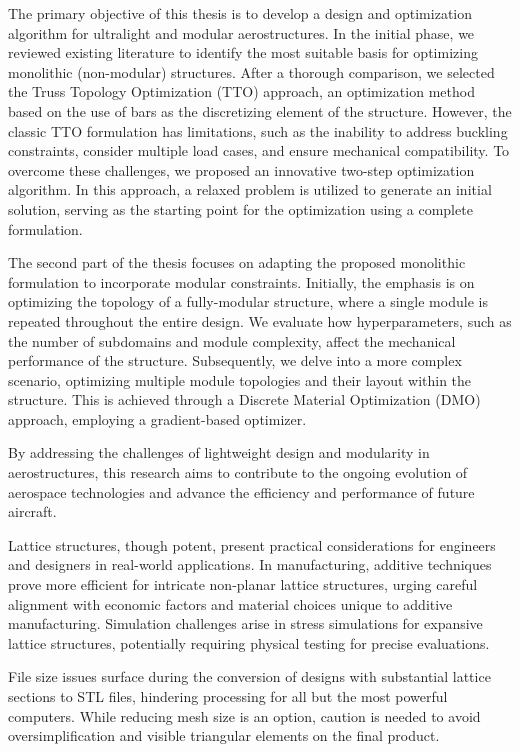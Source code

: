 The primary objective of this thesis is to develop a design and optimization algorithm for ultralight and modular aerostructures. In the initial phase, we reviewed existing literature to identify the most suitable basis for optimizing monolithic (non-modular) structures. After a thorough comparison, we selected the Truss Topology Optimization (TTO) approach, an optimization method based on the use of bars as the discretizing element of the structure. However, the classic TTO formulation has limitations, such as the inability to address buckling constraints, consider multiple load cases, and ensure mechanical compatibility. To overcome these challenges, we proposed an innovative two-step optimization algorithm. In this approach, a relaxed problem is utilized to generate an initial solution, serving as the starting point for the optimization using a complete formulation.

The second part of the thesis focuses on adapting the proposed monolithic formulation to incorporate modular constraints. Initially, the emphasis is on optimizing the topology of a fully-modular structure, where a single module is repeated throughout the entire design. We evaluate how hyperparameters, such as the number of subdomains and module complexity, affect the mechanical performance of the structure. Subsequently, we delve into a more complex scenario, optimizing multiple module topologies and their layout within the structure. This is achieved through a Discrete Material Optimization (DMO) approach, employing a gradient-based optimizer.

By addressing the challenges of lightweight design and modularity in aerostructures, this research aims to contribute to the ongoing evolution of aerospace technologies and advance the efficiency and performance of future aircraft.

Lattice structures, though potent, present practical considerations for engineers and designers in real-world applications. In manufacturing, additive techniques prove more efficient for intricate non-planar lattice structures, urging careful alignment with economic factors and material choices unique to additive manufacturing. Simulation challenges arise in stress simulations for expansive lattice structures, potentially requiring physical testing for precise evaluations.

File size issues surface during the conversion of designs with substantial lattice sections to STL files, hindering processing for all but the most powerful computers. While reducing mesh size is an option, caution is needed to avoid oversimplification and visible triangular elements on the final product.

